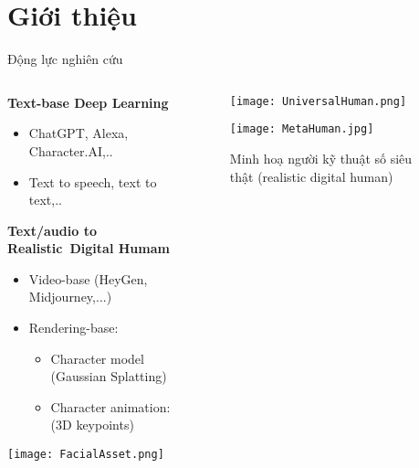 \section{Giới thiệu}

\begin{frame}{Động lực nghiên cứu}
	\vspace{5pt}
	
	\begin{columns}
	\begin{column}{0.7\textwidth}
		\textbf{Text-base Deep Learning}
		\begin{itemize}
			\item ChatGPT, Alexa, Character.AI,..
			\item Text to speech, text to text,..
		\end{itemize}
		
		\textbf{Text/audio to Realistic Digital Humam}
		
		\begin{itemize}
			\item Video-base (HeyGen, Midjourney,...)
			\item Rendering-base:
			\begin{itemize}
				\item Character model (Gaussian Splatting)
				\item Character animation: (3D keypoints)
			\end{itemize}
		\end{itemize}
		\vspace{5pt}
		\centering
		\texttt{[image: FacialAsset.png]}
	\end{column}
	
	\begin{column}{0.3\textwidth}
		\begin{figure}
				\texttt{[image: UniversalHuman.png]}
		\end{figure}
		
		\begin{figure}
			\texttt{[image: MetaHuman.jpg]}
			\caption{\small Minh hoạ người kỹ thuật số siêu thật (realistic digital human)}
		\end{figure}
	
	\end{column}
	
	\end{columns}
\end{frame}

